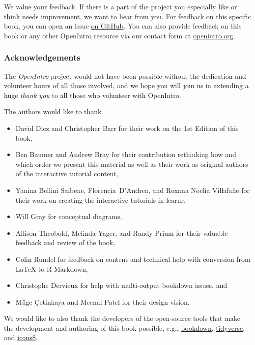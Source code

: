 \documentclass[
  10pt,
  openany]{book}
\providecommand{\tightlist}{%
  \setlength{\itemsep}{0pt}\setlength{\parskip}{0pt}}
\begin{document}
We value your feedback.
If there is a part of the project you especially like or think needs improvement, we want to hear from you.
For feedback on this specific book, you can open an issue \href{https://github.com/openintrostat/ims/issues}{on GitHub}.
You can also provide feedback on this book or any other OpenIntro resource via our contact form at \href{https://www.openintro.org/form/?f=contact}{openintro.org}.

\hypertarget{acknowledgements}{%
\subsubsection*{Acknowledgements}\label{acknowledgements}}

The \emph{OpenIntro} project would not have been possible without the dedication and volunteer hours of all those involved, and we hope you will join us in extending a huge \emph{thank you} to all those who volunteer with OpenIntro.

The authors would like to thank

\begin{itemize}
\tightlist
\item
  David Diez and Christopher Barr for their work on the 1st Edition of this book,
\item
  Ben Baumer and Andrew Bray for their contribution rethinking how and which order we present this material as well as their work as original authors of the interactive tutorial content,
\item
  Yanina Bellini Saibene, Florencia~D'Andrea, and Roxana Noelia Villafañe for their work on creating the interactive tutorials in learnr,
\item
  Will Gray for conceptual diagrams,
\item
  Allison Theobold, Melinda Yager, and Randy Prium for their valuable feedback and review of the book,
\item
  Colin Rundel for feedback on content and technical help with conversion from LaTeX to R Markdown,
\item
  Christophe Dervieux for help with multi-output bookdown issues, and
\item
  Müge Çetinkaya and Meenal Patel for their design vision.
\end{itemize}

We would like to also thank the developers of the open-source tools that make the development and authoring of this book possible, e.g., \href{https://bookdown.org/}{bookdown}, \href{https://tidyverse.org/}{tidyverse}, and \href{http://icons8.com/}{icons8}.
\end{document}
